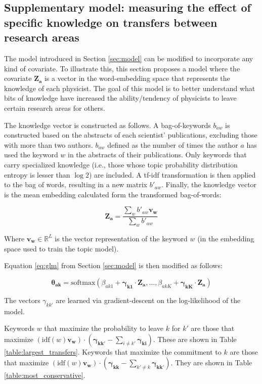 \documentclass{article}
\begin{document}
\subsection{\label{appendix:knowledge}Supplementary model: measuring the effect of specific knowledge on transfers between research areas}

The model introduced in Section \ref{sec:model} can be modified to incorporate any kind of covariate. To illustrate this, this section proposes a model where the covariate $\bm{Z_a}$ is a vector in the word-embedding space that represents the knowledge of each physicist. The goal of this model is to better understand what bits of knowledge have increased the ability/tendency of physicists to leave certain research areas for others. 

The knowledge vector is constructed as follows. A bag-of-keywords $b_{aw}$ is constructed based on the abstracts of each scientist' publications, excluding those with more than two authors. $b_{aw}$ defined as the number of times the author $a$ has used the keyword $w$ in the abstracts of their publications. Only keywords that carry specialized knowledge (i.e., those whose topic probability distribution entropy is lesser than $\log 2$) are included. A tf-idf transformation is then applied to the bag of words, resulting in a new matrix $b'_{aw}$. Finally, the knowledge vector is the mean embedding calculated form the transformed bag-of-words:

\begin{equation}
    \bm{Z_{a}} = \dfrac{\sum_w b'_{aw} \bm{v_{w}}}{\sum_w b'_{aw}} 
\end{equation}

Where $\bm{v_w}\in\mathbb{R}^{L}$ is the vector representation of the keyword $w$ (in the embedding space used to train the topic model). 

Equation \eqref{eq:glm} from Section \ref{sec:model} is then modified as follows:

\begin{equation}
    \bm{\theta_{ak}} = \text{softmax}\left(\beta_{ak1} + \bm{\gamma_{k1}}\cdot \bm{Z_{a}}, \dots,\beta_{akK} +  \bm{\gamma_{kK}}\cdot \bm{Z_{a}} \right)
\end{equation}

The vectors $\gamma_{kk'}$ are learned via gradient-descent on the log-likelihood of the model.

Keywords $w$ that maximize the probability to leave $k$ for $k'$ are those that maximize $(\text{idf}(w) \bm{v_w}) \cdot (\bm{\gamma_{kk'}}-\sum_{i \neq k'}\bm{\gamma_{ki}})$. These are shown in Table \ref{table:largest_transfers}.
Keywords that maximize the commitment to $k$ are those that maximize $ (\text{idf}(w) \bm{v_w}) \cdot (\bm{\gamma_{kk}}-\sum_{k' \neq k}\bm{\gamma_{kk'}})$. They are shown in Table \ref{table:most_conservative}.

\fontsize{6}{7}\selectfont\normalsize
\fontsize{6}{7}\selectfont\normalsize




\end{document}
